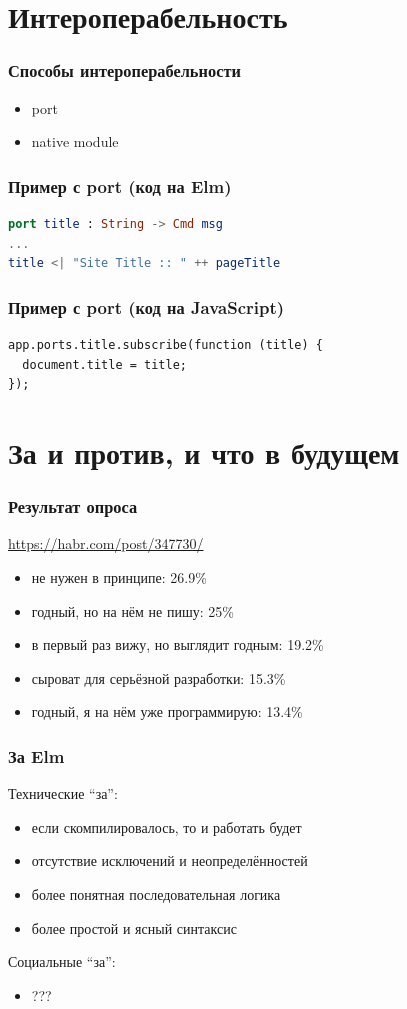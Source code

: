 \documentclass[11pt,aspectratio=169]{beamer}
\begin{document}
\section{Интероперабельность}

\begin{frame}
\frametitle{Способы интероперабельности}
\begin{itemize}
	\item port
	\item native module
\end{itemize}
\end{frame}

\begin{frame}[fragile]
\frametitle{Пример с port (код на Elm)}
\begin{lstlisting}[language=elm]
port title : String -> Cmd msg
...
title <| "Site Title :: " ++ pageTitle
\end{lstlisting}
\end{frame}

\begin{frame}[fragile]
\frametitle{Пример с port (код на JavaScript)}
\begin{lstlisting}
app.ports.title.subscribe(function (title) {
  document.title = title;
});
\end{lstlisting}
\end{frame}

\section{За и против, и что в будущем}

\begin{frame}
\frametitle{Результат опроса}
\url{https://habr.com/post/347730/}
\begin{itemize}
	\item не нужен в принципе: 26.9\%
	\item годный, но на нём не пишу: 25\%
	\item в первый раз вижу, но выглядит годным: 19.2\%
	\item сыроват для серьёзной разработки: 15.3\%
	\item годный, я на нём уже программирую: 13.4\%
\end{itemize}
\end{frame}

\begin{frame}
\frametitle{За Elm}
Технические ``за'':
\begin{itemize}
	\item если скомпилировалось, то и работать будет
	\item отсутствие исключений и неопределённостей
	\item более понятная последовательная логика
	\item более простой и ясный синтаксис
\end{itemize}

Социальные ``за'':
\begin{itemize}
	\item ???
\end{itemize}
\end{frame}
\end{document}
